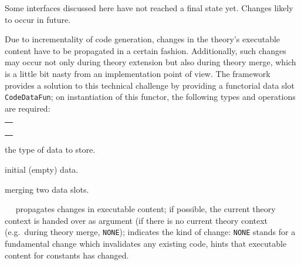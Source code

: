 \begin{isabellebody}
\begin{isamarkuptext}
  \begin{warn}
    Some interfaces discussed here have not reached
    a final state yet.
    Changes likely to occur in future.
  \end{warn}%
\end{isamarkuptext}%
\isamarkuptrue%
%
\isamarkuptrue%
%
\begin{isamarkuptext}%
Due to incrementality of code generation, changes in the
  theory's executable content have to be propagated in a
  certain fashion.  Additionally, such changes may occur
  not only during theory extension but also during theory
  merge, which is a little bit nasty from an implementation
  point of view.  The framework provides a solution
  to this technical challenge by providing a functorial
  data slot \verb|CodeDataFun|; on instantiation
  of this functor, the following types and operations
  are required:

  \medskip
  \begin{tabular}{l}
  \isa{type\ T} \\
  \isa{val\ empty{\isacharcolon}\ T} \\
  \isa{val\ merge{\isacharcolon}\ Pretty{\isachardot}pp\ {\isasymrightarrow}\ T\ {\isacharasterisk}\ T\ {\isasymrightarrow}\ T} \\
  \isa{val\ purge{\isacharcolon}\ theory\ option\ {\isasymrightarrow}\ CodeUnit{\isachardot}const\ list\ option\ {\isasymrightarrow}\ T\ {\isasymrightarrow}\ T}
  \end{tabular}

  \begin{description}

  \item {} the type of data to store.

  \item {} initial (empty) data.

  \item {} merging two data slots.

  \item {}~~ propagates changes in executable content;
    if possible, the current theory context is handed over
    as argument  (if there is no current theory context (e.g.~during
    theory merge, \verb|NONE|);  indicates the kind
    of change: \verb|NONE| stands for a fundamental change
    which invalidates any existing code, 
    hints that executable content for constants 
    has changed.


\end{description}
\end{isamarkuptext}
\end{isabellebody}
